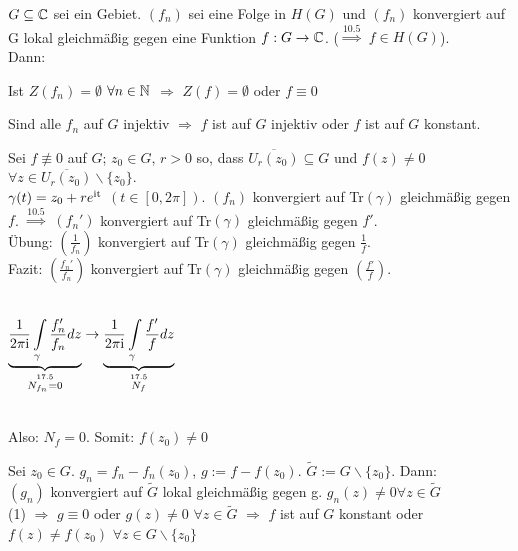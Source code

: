 \documentclass[a4paper,twoside,DIV15,BCOR12mm]{scrbook}
\def\wegint{\ensuremath{\int\limits_\gamma}}
\def\ie{\rm i}
\begin{document}
\begin{satz} 
  $G \subseteq \mathbb{C}$ sei ein Gebiet. $(f_n)$ sei eine Folge in $H(G)$ und $(f_n)$
  konvergiert auf G lokal gleichm\"a{\ss}ig gegen eine Funktion $f: G \to \mathbb{C}$.
  ($\stackrel{\text{10.5}}{\Rightarrow}$ $f \in H(G)$). \\ Dann:
  \begin{liste}
    \item Ist $Z(f_n) = \emptyset$ $\forall n \in \mathbb{N}$ $\Rightarrow$ $Z(f) =
    \emptyset$ oder $f \equiv 0$
    \item Sind alle $f_n$ auf $G$ injektiv $\Rightarrow$ $f$ ist auf $G$ injektiv
    oder $f$ ist auf $G$ konstant.
  \end{liste}
\end{satz}

\begin{beweis}
  \begin{liste}
    \item Sei $f \not \equiv 0$ auf $G$; $z_0 \in G$, $r > 0$ so, dass
    $\overline{U_r(z_0)} \subseteq G$ und $f(z) \neq 0$ $\forall z \in
    \overline{U_r(z_0)} \backslash \{z_0\} $. \\
    $\gamma(t) = z_0 + re^{\ie t}$ $(t \in [0, 2 \pi])$. $(f_n)$ konvergiert auf
    Tr$(\gamma)$ gleichm\"a{\ss}ig gegen $f$. $\stackrel{\text{10.5}}{\Rightarrow}$
    $(f_n')$ konvergiert auf Tr$(\gamma)$ gleichm\"a{\ss}ig gegen $f'$. \\
     \"Ubung: $(\frac{1}{f_n})$ konvergiert auf Tr$(\gamma)$ gleichm\"a{\ss}ig gegen
    $\frac{1}{f}$. \\
    Fazit: $(\frac{f_n'}{f_n})$ konvergiert auf Tr$(\gamma)$ gleichm\"a{\ss}ig gegen
    $(\frac{f'}{f})$. \\ \\
    \centerline{$\underbrace{\frac{1}{2 \pi \ie} \wegint \frac{f_n'}{f_n} dz}_{\stackrel{\text{17.5}}{N_{f_n}=0}} \to 
    \underbrace{\frac{1}{2 \pi \ie} \wegint \frac{f'}{f}
    dz}_{\stackrel{\text{17.5}}{N_{f}}} $} \\ Also: $N_f = 0$. Somit: $f(z_0) \neq
    0$ 
    \item Sei $z_0 \in G$. $g_n = f_n-f_n(z_0)$, $g := f - f(z_0)$. $\widetilde{G}:=G\backslash \{z_0\}$. Dann:\\
    $(g_n)$ konvergiert auf $\widetilde{G}$ lokal gleichm\"a{\ss}ig gegen g. $g_n(z)\neq 0 \forall z \in \widetilde{G}$\\
    (1) $\Rightarrow$ $g \equiv 0$ oder $g(z) \neq 0$ $\forall z \in
    \widetilde{G}$ $\Rightarrow$ $f$ ist auf $G$ konstant oder $f(z) \neq f(z_0)$
    $\forall z  \in G \backslash \{z_0\}$
   \end{liste}
\end{beweis}
\end{document}
